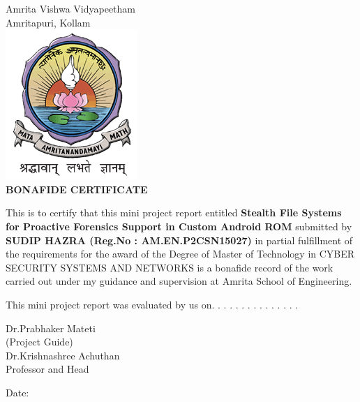 


\begin{titlingpage}
\begin{SingleSpace}
\vspace{-1cm}
	\begin{center}

	{\HUGE Amrita Vishwa Vidyapeetham}\\[4mm]
	{\HUGE Amritapuri, Kollam}\\[4mm]
	\vspace{11mm}
	\includegraphics[scale=0.9]{logos/AVV_colour}\\
	\vspace{6mm}
			\large\textbf{BONAFIDE CERTIFICATE}
	\end{center}%
	  This is to certify that this mini project report entitled \textbf{Stealth File Systems for Proactive Forensics Support in Custom Android ROM}
	  submitted by \textbf{SUDIP HAZRA (Reg.No : AM.EN.P2CSN15027)} in partial fulfillment of
	  the requirements for the award of the Degree of Master of Technology in CYBER SECURITY SYSTEMS AND NETWORKS
	  is a bonafide record of the work carried out under my guidance and supervision at Amrita School
	  of Engineering.
	  
	  \vspace{6.5mm}
	  \begin{center}
	  This mini project report was evaluated by us on. . . . . . . . . . . . . . .
	  	 
	  \end{center}
	  \vfill
	  
	  
	  \begin{flushright}
	  Dr.Prabhaker Mateti\\
	  (Project Guide)\\[1.5cm]
	  Dr.Krishnashree Achuthan\\
	  Professor and Head\\
	  \end{flushright}
	  
	  \begin{flushleft}
	  Date:
	  \end{flushleft}
	  
	   
	  	
	  	  
	
	  
	  
	  
	  
	
	
	
	\end{SingleSpace}
	\end{titlingpage}